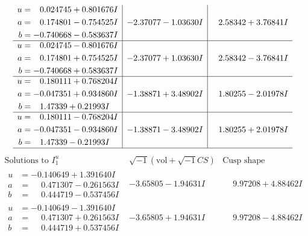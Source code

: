\documentclass[1p]{elsarticle_modified}
\theoremstyle{definition}
\newcommand{\I}{\sqrt{-1}}
\begin{document}
$$\begin{array}{c|c|c}
\begin{aligned}
u &= \phantom{-}0.024745 + 0.801676 I \\
a &= \phantom{-}0.174801 - 0.754525 I \\
b &= -0.740668 - 0.583637 I\end{aligned}
 & -2.37077 - 1.03630 I & \phantom{-}2.58342 + 3.76841 I \\ \hline\begin{aligned}
u &= \phantom{-}0.024745 - 0.801676 I \\
a &= \phantom{-}0.174801 + 0.754525 I \\
b &= -0.740668 + 0.583637 I\end{aligned}
 & -2.37077 + 1.03630 I & \phantom{-}2.58342 - 3.76841 I \\ \hline\begin{aligned}
u &= \phantom{-}0.180111 + 0.768204 I \\
a &= -0.047351 + 0.934860 I \\
b &= \phantom{-}1.47339 + 0.21993 I\end{aligned}
 & -1.38871 + 3.48902 I & \phantom{-}1.80255 - 2.01978 I \\ \hline\begin{aligned}
u &= \phantom{-}0.180111 - 0.768204 I \\
a &= -0.047351 - 0.934860 I \\
b &= \phantom{-}1.47339 - 0.21993 I\end{aligned}
 & -1.38871 - 3.48902 I & \phantom{-}1.80255 + 2.01978 I\\
 \hline 
 \end{array}$$\newpage$$\begin{array}{c|c|c}  
\text{Solutions to }I^u_{1}& \I (\text{vol} + \sqrt{-1}CS) & \text{Cusp shape}\\
 \hline 
\begin{aligned}
u &= -0.140649 + 1.391640 I \\
a &= \phantom{-}0.471307 - 0.261563 I \\
b &= \phantom{-}0.444719 - 0.537456 I\end{aligned}
 & -3.65805 - 1.94631 I & \phantom{-}9.97208 + 4.88462 I \\ \hline\begin{aligned}
u &= -0.140649 - 1.391640 I \\
a &= \phantom{-}0.471307 + 0.261563 I \\
b &= \phantom{-}0.444719 + 0.537456 I\end{aligned}
 & -3.65805 + 1.94631 I & \phantom{-}9.97208 - 4.88462 I \\ \hline\begin{aligned}

\end{aligned}
\end{array}$$
\end{document}
